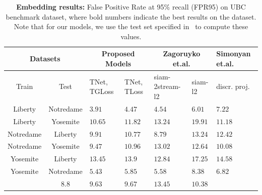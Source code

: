 \documentclass[10pt,twocolumn,letterpaper]{article}
\begin{document}
\begin{table}[ht!]
\begin{center}
\tabcolsep=0.05cm
 \begin{tabular}{|c| c| m{1cm}| m{1cm}|m{1cm}|m{1cm}|m{1cm}|} 
 \hline
 \multicolumn{2}{|c|}{\scriptsize{Datasets}} & \multicolumn{2}{c|}{\scriptsize{Proposed Models}} & \multicolumn{2}{c|}{\scriptsize{Zagoruyko} {et.al.}\cite{ZagoruykoCVPR15}} & \scriptsize{Simonyan {et.al.}} \cite{Simonyanpami14}\\
  \hline
  \scriptsize{Train} & \scriptsize{Test} & \scriptsize{TNet, TGLoss} & \scriptsize{TNet, TLoss} & \scriptsize{siam-2stream-l2} & \scriptsize{siam-l2} &\scriptsize{discr. proj.}\\
 \hline   
 \scriptsize{Liberty} & \scriptsize{Notredame} &  \scriptsize{$\mathbf{3.91}$ }    &   \scriptsize{$4.47$ } & \scriptsize{$4.54$ }  &  \scriptsize{$6.01$}    &\scriptsize{$7.22$} \\
 \hline
 \scriptsize{Liberty} & \scriptsize{Yosemite} &     \scriptsize{$\mathbf{10.65}$ } &     \scriptsize{$11.82$ } & \scriptsize{ $13.24$ } &      \scriptsize{$19.91$}    & \scriptsize{$11.18$ }    \\
 \hline
 \scriptsize{Notredame}& \scriptsize{Liberty } &    \scriptsize{   $9.91$ }   &     \scriptsize{ $10.77$ }   &    \scriptsize{ $\mathbf{8.79}$} &   \scriptsize{ $13.24$}   &    \scriptsize{$12.42$}      \\
 \hline
 \scriptsize{Notredame}&\scriptsize{Yosemite} &   \scriptsize{$\mathbf{9.47}$ }   &     \scriptsize{  $10.96$}    &     \scriptsize{ $13.02$}   & \scriptsize{ $12.64$ }  & \scriptsize{$10.08$  }    \\
 \hline
 \scriptsize{Yosemite} & \scriptsize{Liberty} &   \scriptsize{   $13.45$}   &      \scriptsize{ $13.9$ }    &  \scriptsize{$\mathbf{12.84}$ } &  \scriptsize{ $17.25$}    &  \scriptsize{$14.58$ }     \\
 \hline
 \scriptsize{Yosemite}&\scriptsize{Notredame} &   \scriptsize{ $\mathbf{5.43}$}   &     \scriptsize{   $5.85$}   &   \scriptsize{ $5.58$ }  &   \scriptsize{ $ 8.38$  }  & \scriptsize{$6.82$ }      \\
 \Xhline{2\arrayrulewidth}
 \multicolumn{2}{|c|}{\scriptsize{\textbf{mean}}}   &    \scriptsize{  $\mathbf{8.8}$}   &    \scriptsize{ $9.63$}  &   \scriptsize{  $9.67$ } &   \scriptsize{ $13.45$ }   & \scriptsize{$10.38$ }    \\
\hline
 \end{tabular}
 \bigskip
 \caption{{\bf Embedding results:} False Positive Rate at 95\% recall (FPR95) on UBC benchmark dataset, where bold numbers indicate the best results on the dataset.  Note that for our models, we use the test set specified in~\cite{UBC_dataset} to compute these values.}
 \label{tbl:table_fpr_embedding}
\end{center}
\end{table}
\end{document}
